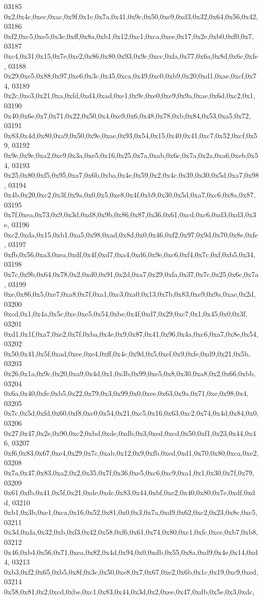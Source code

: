 \begin{DoxyCode}
03185   0x2,0x4c,0xec,0xac,0x9f,0x1c,0x7a,0x41,0x9c,0x50,0xe9,0xd3,0x32,0x64,0x56,0x42,
03186   0xf2,0xc5,0xe5,0x3e,0xff,0x8a,0xb1,0x12,0xc1,0xca,0xee,0x17,0x2e,0xb0,0xf0,0x7,
03187   0xc4,0x31,0x15,0x7e,0xe2,0x86,0x80,0x93,0x9c,0xcc,0xfa,0x77,0x6a,0x8d,0x6c,0xfe,
03188   0x29,0xe5,0x88,0x97,0xe6,0x3c,0x45,0xca,0x49,0xc0,0xb9,0x20,0xd1,0xae,0xcf,0x74,
03189   0x2c,0xe3,0x21,0xa,0xfd,0xd4,0xad,0xe1,0x9c,0xe0,0xe9,0x9a,0xae,0x6d,0xc2,0x1,
03190   0x40,0x6e,0x7,0x71,0x22,0x50,0x4,0xe9,0x6,0x48,0x78,0xb,0x84,0x53,0xa5,0x72,
03191   0x83,0x4d,0x80,0xa9,0x50,0x9e,0xae,0x93,0x54,0x15,0x40,0x41,0xc7,0x52,0xcf,0x59,
03192   0x9e,0x9e,0xa2,0xe9,0x3a,0xe5,0x16,0x25,0x7a,0xab,0x6c,0x7a,0x2a,0xa6,0xeb,0x54,
03193   0x25,0x80,0xf5,0x95,0xa7,0x6b,0xba,0x4e,0x59,0x2,0x4c,0x39,0x30,0x5d,0xa7,0x98,
03194   0x4b,0x20,0xc2,0x3f,0x9a,0x0,0x5,0xe8,0x4f,0xb9,0x30,0x5d,0xa7,0xc6,0x8a,0x87,
03195   0x7f,0xea,0x73,0x9,0x3d,0xd8,0x9b,0x86,0x87,0x36,0x61,0xcd,0xc6,0xd3,0xd3,0x3e,
03196   0xc2,0xda,0x15,0xb1,0xa5,0x98,0xad,0x8d,0x0,0x46,0xf2,0x97,0x9d,0x70,0x8e,0xfe,
03197   0xfb,0x56,0xa3,0xea,0xdf,0x4f,0xd7,0xa4,0xd6,0x9e,0xc6,0xf4,0x7c,0xf,0xb5,0x34,
03198   0x7c,0x9b,0x64,0x78,0x2,0xd0,0x91,0x2d,0xa7,0x29,0xfa,0x37,0x7c,0x25,0x6c,0x7a,
03199   0xe,0x86,0x5,0xe7,0xa8,0x7f,0xa1,0xc3,0xa0,0x13,0x7b,0x83,0xe9,0x9a,0xae,0x2d,
03200   0xcd,0x1,0x4a,0x5c,0xe,0xe5,0x54,0xbe,0x4f,0xd7,0x29,0xc7,0x1,0x45,0x0,0x3f,
03201   0xd1,0x1f,0xa7,0xe2,0x7f,0xba,0x4e,0x9,0x87,0x41,0x96,0x4a,0xc6,0xa7,0x8e,0x54,
03202   0x50,0x41,0x5f,0xad,0xee,0xe4,0xff,0x4c,0x9d,0x5,0xef,0x9,0xfe,0xd9,0x21,0x5b,
03203   0x26,0x1a,0x9c,0x20,0xa9,0x4d,0x1,0x3b,0x99,0xe5,0x8,0x30,0xa8,0x2,0x66,0xbb,
03204   0x6a,0x40,0xfe,0xb5,0x22,0x79,0x3,0x99,0x0,0xee,0x63,0x9a,0x71,0xe,0x98,0x4,
03205   0x7c,0x5d,0xfd,0x60,0xf8,0xc0,0x54,0x21,0xc5,0x16,0x63,0xc2,0x74,0x4d,0x84,0x0,
03206   0x27,0x47,0x2e,0x90,0xc2,0xbd,0xde,0xdb,0x3,0xed,0xcd,0x50,0xf1,0x23,0x44,0x46,
03207   0xf6,0x83,0x67,0xe4,0x29,0x7c,0xab,0x12,0x9,0xfb,0xed,0xd1,0x70,0x80,0xca,0xe2,
03208   0x7a,0x47,0x83,0xa2,0x2,0x35,0x7f,0x36,0xe5,0xc6,0xc9,0xa1,0x1,0x30,0x7f,0x79,
03209   0x61,0xfb,0x41,0x5f,0x21,0xde,0xdc,0x83,0x44,0xbf,0xe2,0x40,0x80,0x7e,0xdf,0xdd,
03210   0xb1,0x3b,0xe1,0xca,0x16,0x52,0x81,0x0,0x3,0x7a,0xd9,0x62,0xc2,0x23,0x8c,0xc5,
03211   0x3d,0xda,0x32,0xb,0xf3,0x42,0x58,0xf6,0x61,0x74,0x80,0xc1,0xfc,0xce,0xb7,0xb8,
03212   0x46,0xb4,0x56,0x71,0xea,0x82,0x4d,0x94,0x0,0xdb,0x55,0x8a,0xd9,0x4e,0x14,0xd4,
03213   0xb3,0xf2,0x65,0xb5,0x8f,0x3c,0x50,0xe8,0x7,0x67,0xe2,0x6b,0x1c,0x19,0xc9,0xed,
03214   0x58,0x81,0x2,0xcd,0xbe,0xc1,0x83,0x44,0x3d,0x2,0xee,0x47,0xdb,0x5e,0x3,0xdc,

\end{DoxyCode}
